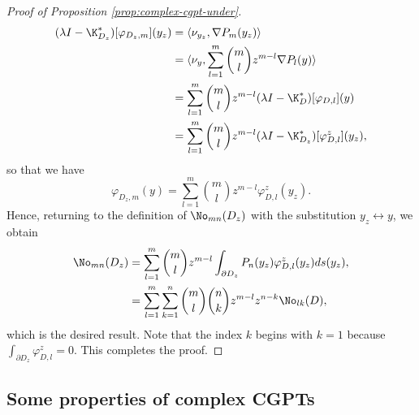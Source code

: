 \begin{proof}[Proof of Proposition \ref{prop:complex-cgpt-under}]
\begin{equation*}
\begin{aligned}
(\lambda I - \K^*_{D_z})[\varphi_{D_z,m}](y_z) & = \langle \nu_{y_z}, \nabla P_m(y_z) \rangle \\
 &= \langle \nu_{y},\sum_{l=1}^m  \binom {m} {l} z^{m-l}\nabla P_l(y)  \rangle \\
 &= \sum_{l=1}^m  \binom {m} {l} z^{m-l} (\lambda I-\K^{*}_D)[\varphi_{D,l}] (y) \\
 &= \sum_{l=1}^m  \binom {m} {l} z^{m-l} (\lambda I-\K^{*}_{D_z})[\varphi^z_{D,l}] (y_z), \\
\end{aligned}
\end{equation*}
so that we have
\begin{equation*}
\varphi_{D_z,m} (y)= \sum_{l=1}^m  \binom {m} {l} z^{m-l}
\varphi^z_{D,l}(y_z).
\end{equation*}
Hence, returning to the definition of $\No_{mn}(D_z)$ with the
substitution $y_z\leftrightarrow y$, we obtain
\begin{equation*}
\begin{aligned}
\No_{mn}(D_z) &= \sum_{l=1}^m \binom{m}{l} z^{m-l }\int_{\partial D_z}P_n(y_z) \varphi^z_{D,l}(y_z) ds(y_z), \\
 &= \sum_{l=1}^m \sum_{k=1}^n \binom{m}{l}\binom{n}{k}z^{m-l}z^{n-k}\No_{lk}(D),
\end{aligned}
\end{equation*}
which is the desired result. Note that the index $k$ begins with
$k=1$ because $\int_{\partial D_z}\varphi^z_{D,l} = 0$. This
completes the proof. \end{proof}

\subsection{Some properties of complex CGPTs}\label{sec:some-properties-ccgpt}

